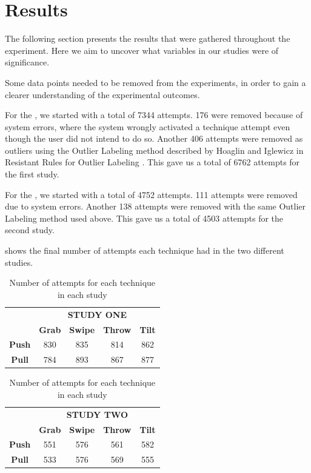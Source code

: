\section{Results}\label{sec:results}
The following section presents the results that were gathered throughout the experiment.
Here we aim to uncover what variables in our studies were of significance.

Some data points needed to be removed from the experiments, in order to gain a clearer understanding of the experimental outcomes. 

For the \target, we started with a total of 7344 attempts.
176 were removed because of system errors, where the system wrongly activated a technique attempt even though the user did not intend to do so.
Another 406 attempts were removed as outliers using the Outlier Labeling method described by Hoaglin and Iglewicz in Resistant Rules for Outlier Labeling \cite{Hoaglin:1987}.
This gave us a total of 6762 attempts for the first study.

For the \accuracy, we started with a total of 4752 attempts.
111 attempts were removed due to system errors. 
Another 138 attempts were removed with the same Outlier Labeling method used above.
This gave us a total of 4503 attempts for the second study.

 shows the final number of attempts each technique had in the two different studies.

\begin{table}[H]
	\centering
	\begin{adjustbox}{width=\columnwidth}
		{
			\def\arraystretch{1.5}
			\begin{tabular}{c c c c c}
				& \multicolumn{4}{c}{\textbf{STUDY ONE}} \\
				\cline{2-5}
				& \textbf{Grab} & \textbf{Swipe} & \textbf{Throw} & \textbf{Tilt} \\ \hline
				\textbf{Push} & 830 & 835 & 814 & 862 \\ \hline
				\textbf{Pull} & 784 & 893 & 867 & 877 \\ \hline
			\end{tabular}
		}
		{
			\def\arraystretch{1.5}
			\begin{tabular}{c c c c c}
				& \multicolumn{4}{c}{\textbf{STUDY TWO}} \\
				\cline{2-5}
				& \textbf{Grab} & \textbf{Swipe} & \textbf{Throw} & \textbf{Tilt} \\ \hline
				\textbf{Push} & 551 & 576 & 561 & 582 \\ \hline
				\textbf{Pull} & 533 & 576 & 569 & 555 \\ \hline
			\end{tabular}
		}
	\end{adjustbox}
	\caption{Number of attempts for each technique in each study}
	\label{tab:numberOfAttempts}
\end{table}

